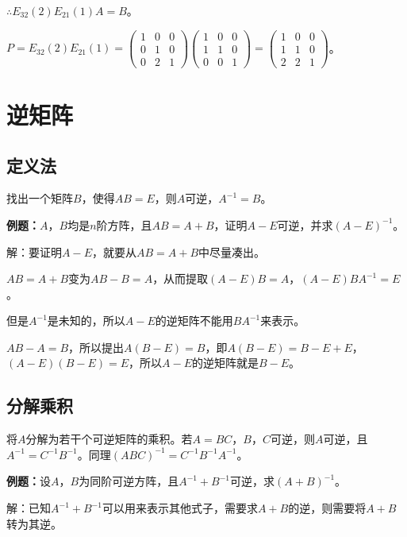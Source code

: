 \documentclass[UTF8, 12pt]{ctexart}
\begin{document}
$\therefore E_{32}(2)E_{21}(1)A=B$。

$P=E_{32}(2)E_{21}(1)=\left(\begin{array}{ccc}
    1 & 0 & 0 \\
    0 & 1 & 0 \\
    0 & 2 & 1
\end{array}\right)\left(\begin{array}{ccc}
    1 & 0 & 0 \\
    1 & 1 & 0 \\
    0 & 0 & 1
\end{array}\right)=\left(\begin{array}{ccc}
    1 & 0 & 0 \\
    1 & 1 & 0 \\
    2 & 2 & 1
\end{array}\right)$。

\section{逆矩阵}

\subsection{定义法}

找出一个矩阵$B$，使得$AB=E$，则$A$可逆，$A^{-1}=B$。

\textbf{例题：}$A$，$B$均是$n$阶方阵，且$AB=A+B$，证明$A-E$可逆，并求$(A-E)^{-1}$。

解：要证明$A-E$，就要从$AB=A+B$中尽量凑出。

$AB=A+B$变为$AB-B=A$，从而提取$(A-E)B=A$，$(A-E)BA^{-1}=E$。

但是$A^{-1}$是未知的，所以$A-E$的逆矩阵不能用$BA^{-1}$来表示。

$AB-A=B$，所以提出$A(B-E)=B$，即$A(B-E)=B-E+E$，$(A-E)(B-E)=E$，所以$A-E$的逆矩阵就是$B-E$。

\subsection{分解乘积}

将$A$分解为若干个可逆矩阵的乘积。若$A=BC$，$B$，$C$可逆，则$A$可逆，且$A^{-1}=C^{-1}B^{-1}$。同理$(ABC)^{-1}=C^{-1}B^{-1}A^{-1}$。

\textbf{例题：}设$A$，$B$为同阶可逆方阵，且$A^{-1}+B^{-1}$可逆，求$(A+B)^{-1}$。

解：已知$A^{-1}+B^{-1}$可以用来表示其他式子，需要求$A+B$的逆，则需要将$A+B$转为其逆。
\end{document}
